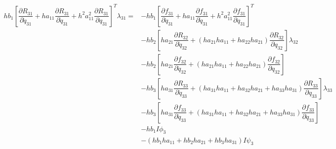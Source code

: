 \documentclass[10pt,letter]{book}
\newcommand{\pd}[2]{\dfrac{\partial #1}{\partial #2}}
\begin{document}
     \begin{equation}
       \begin{split}
         hb_1\left[\pd{R_{31}}{\ddot{q}_{31}} + ha_{11}\pd{R_{31}}{\dot{q}_{31}} + h^2a_{11}^2 \pd{R_{31}}{{q}_{31}} \right]^T \lambda_{31} = & - hb_1 \left[\pd{f_{31}}{\ddot{q}_{31}} + ha_{11}\pd{f_{31}}{\dot{q}_{31}} + h^2a_{11}^2 \pd{f_{31}}{{q}_{31}} \right]^T \\ 
         & - hb_2 \left[ ha_{21} \pd{R_{32}}{\dot{q}_{32}} + (ha_{21}ha_{11} + ha_{22}ha_{21}) \pd{R_{32}}{{q}_{32}} \right]\lambda_{32} \\
         & - hb_2 \left[ ha_{21} \pd{f_{32}}{\dot{q}_{32}} + (ha_{21}ha_{11} + ha_{22}ha_{21}) \pd{f_{32}}{{q}_{32}} \right] \\
         & - hb_3 \left[ ha_{31} \pd{R_{33}}{\dot{q}_{33}} + (ha_{31}ha_{11} + ha_{32}ha_{21} + ha_{33}ha_{31}) \pd{R_{33}}{{q}_{33}} \right] \lambda_{33} \\
         & - hb_3 \left[ ha_{31} \pd{f_{33}}{\dot{q}_{33}} + (ha_{31}ha_{11} + ha_{32}ha_{21} + ha_{33}ha_{31}) \pd{f_{33}}{{q}_{33}} \right] \\
         & - hb_1I \phi_3 \\ 
         & - (hb_1ha_{11} + hb_2ha_{21}+ hb_3ha_{31}) I \psi_3
       \end{split}
     \end{equation}
\end{document}
